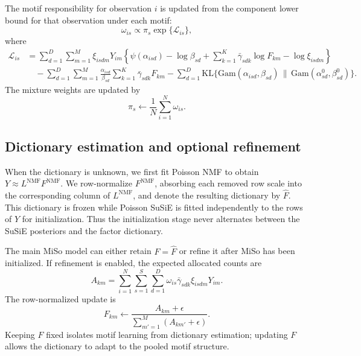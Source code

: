 \documentclass[11pt]{article}
\newcommand{\Gam}{\mathrm{Gam}}
\newcommand{\KL}{\mathrm{KL}}
\theoremstyle{plain}
\theoremstyle{definition}
\begin{document}
The motif responsibility for observation $i$ is updated from the component
lower bound for that observation under each motif:
\begin{equation}
  \omega_{is}
  \propto
  \pi_s \exp\{\mathcal{L}_{is}\},
  \label{eq:miso-responsibility-update}
\end{equation}
where
\begin{align*}
  \mathcal{L}_{is}
  &=
  \sum_{d=1}^D\sum_{m=1}^M
  \xi_{isdm}Y_{im}
  \left\{
    \psi(\alpha_{isd})-\log\beta_{sd}
    +
    \sum_{k=1}^K \bar{\gamma}_{sdk}\log F_{km}
    -
    \log \xi_{isdm}
  \right\}
  \\
  &\quad
  -
  \sum_{d=1}^D\sum_{m=1}^M
  \frac{\alpha_{isd}}{\beta_{sd}}
  \sum_{k=1}^K \bar{\gamma}_{sdk}F_{km}
  -
  \sum_{d=1}^D
  \KL\{\Gam(\alpha_{isd},\beta_{sd})
  \,\|\,\Gam(\alpha_{sd}^0,\beta_{sd}^0)\}.
\end{align*}
The mixture weights are updated by
\begin{equation}
  \pi_s \leftarrow \frac{1}{N}\sum_{i=1}^N \omega_{is}.
  \label{eq:miso-mixture-update}
\end{equation}

\subsection{Dictionary estimation and optional refinement}

When the dictionary is unknown, we first fit Poisson NMF to obtain
$Y\approx L^{\mathrm{NMF}}F^{\mathrm{NMF}}$. We row-normalize
$F^{\mathrm{NMF}}$, absorbing each removed row scale into the corresponding
column of $L^{\mathrm{NMF}}$, and denote the resulting dictionary by
$\widehat F$. This dictionary is frozen while Poisson SuSiE is fitted
independently to the rows of $Y$ for initialization. Thus the initialization
stage never alternates between the SuSiE posteriors and the factor dictionary.

The main MiSo model can either retain $F=\widehat F$ or refine it after MiSo
has been initialized. If refinement is enabled, the expected allocated counts
are
\[
  A_{km}
  =
  \sum_{i=1}^N\sum_{s=1}^S\sum_{d=1}^D
  \omega_{is}\bar{\gamma}_{sdk}\xi_{isdm}Y_{im}.
\]
The row-normalized update is
\begin{equation}
  F_{km}
  \leftarrow
  \frac{A_{km}+\epsilon}
       {\sum_{m'=1}^M(A_{km'}+\epsilon)}.
  \label{eq:miso-F-update}
\end{equation}
Keeping $F$ fixed isolates motif learning from dictionary estimation; updating
$F$ allows the dictionary to adapt to the pooled motif structure.
\end{document}
